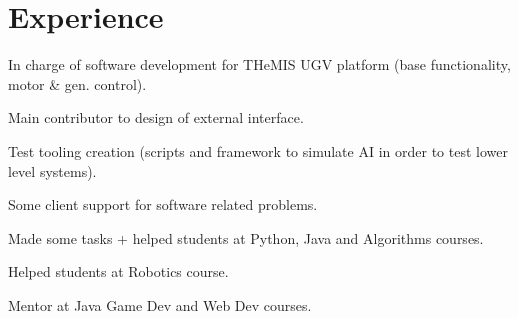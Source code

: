 \documentclass[]{deedy-resume-openfont}
\begin{document}
\begin{minipage}[t]{0.66\textwidth} %


\section{Experience}


\vspace{\topsep} %
\begin{tightitemize}
  \item In charge of software development for THeMIS UGV platform (base functionality, motor \& gen. control).
  \item Main contributor to design of external interface.
  \item Test tooling creation (scripts and framework to simulate AI in order to test lower level systems).
  \item Some client support for software related problems.
\end{tightitemize}

\sectionspace %



\begin{tightitemize}
\item Made some tasks + helped students at Python, Java and Algorithms courses.
\item Helped students at Robotics course.
\item Mentor at Java Game Dev and Web Dev courses.
\end{tightitemize}

\sectionspace %




\end{minipage}
\end{document}
